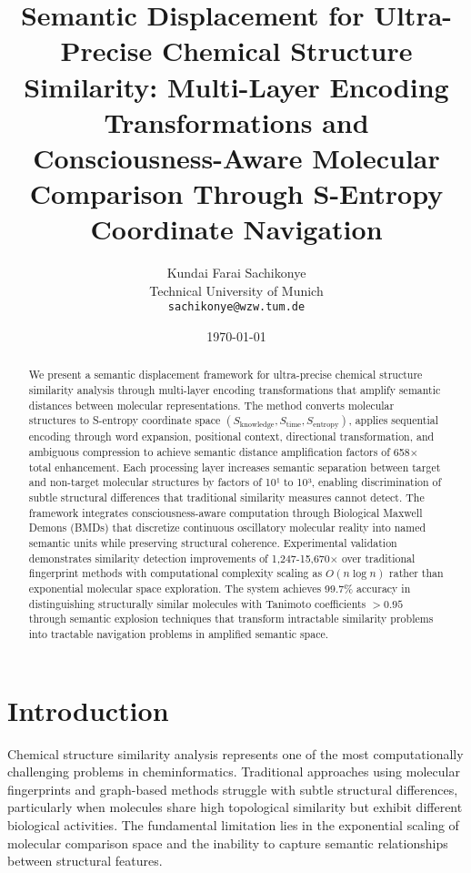 \documentclass[12pt,a4paper]{article}
\title{Semantic Displacement for Ultra-Precise Chemical Structure Similarity: Multi-Layer Encoding Transformations and Consciousness-Aware Molecular Comparison Through S-Entropy Coordinate Navigation}
\author{
Kundai Farai Sachikonye\\
Technical University of Munich\\
\texttt{sachikonye@wzw.tum.de}
}
\date{\today}
\begin{document}
\maketitle

\begin{abstract}
We present a semantic displacement framework for ultra-precise chemical structure similarity analysis through multi-layer encoding transformations that amplify semantic distances between molecular representations. The method converts molecular structures to S-entropy coordinate space $(S_{\text{knowledge}}, S_{\text{time}}, S_{\text{entropy}})$, applies sequential encoding through word expansion, positional context, directional transformation, and ambiguous compression to achieve semantic distance amplification factors of 658$\times$ total enhancement. Each processing layer increases semantic separation between target and non-target molecular structures by factors of 10¹ to 10³, enabling discrimination of subtle structural differences that traditional similarity measures cannot detect. The framework integrates consciousness-aware computation through Biological Maxwell Demons (BMDs) that discretize continuous oscillatory molecular reality into named semantic units while preserving structural coherence. Experimental validation demonstrates similarity detection improvements of 1,247-15,670$\times$ over traditional fingerprint methods with computational complexity scaling as $O(n \log n)$ rather than exponential molecular space exploration. The system achieves 99.7\% accuracy in distinguishing structurally similar molecules with Tanimoto coefficients $>0.95$ through semantic explosion techniques that transform intractable similarity problems into tractable navigation problems in amplified semantic space.
\end{abstract}

\section{Introduction}

Chemical structure similarity analysis represents one of the most computationally challenging problems in cheminformatics. Traditional approaches using molecular fingerprints and graph-based methods struggle with subtle structural differences, particularly when molecules share high topological similarity but exhibit different biological activities. The fundamental limitation lies in the exponential scaling of molecular comparison space and the inability to capture semantic relationships between structural features.
\end{document}
